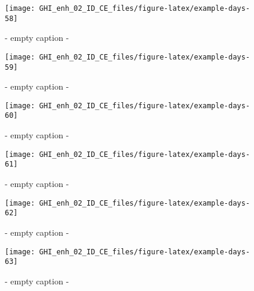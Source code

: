 \documentclass[
  10pt,
  a4paper,oneside]{article}
\begin{document}
\begin{figure}[H]

{\centering \texttt{[image: GHI\_enh\_02\_ID\_CE\_files/figure-latex/example-days-58]} 

}

\caption{ - empty caption - }\label{fig:example-days-58}
\end{figure}

\begin{figure}[H]

{\centering \texttt{[image: GHI\_enh\_02\_ID\_CE\_files/figure-latex/example-days-59]} 

}

\caption{ - empty caption - }\label{fig:example-days-59}
\end{figure}

\begin{figure}[H]

{\centering \texttt{[image: GHI\_enh\_02\_ID\_CE\_files/figure-latex/example-days-60]} 

}

\caption{ - empty caption - }\label{fig:example-days-60}
\end{figure}

\begin{figure}[H]

{\centering \texttt{[image: GHI\_enh\_02\_ID\_CE\_files/figure-latex/example-days-61]} 

}

\caption{ - empty caption - }\label{fig:example-days-61}
\end{figure}

\begin{figure}[H]

{\centering \texttt{[image: GHI\_enh\_02\_ID\_CE\_files/figure-latex/example-days-62]} 

}

\caption{ - empty caption - }\label{fig:example-days-62}
\end{figure}

\begin{figure}[H]

{\centering \texttt{[image: GHI\_enh\_02\_ID\_CE\_files/figure-latex/example-days-63]} 

}

\caption{ - empty caption - }\label{fig:example-days-63}
\end{figure}
\end{document}
